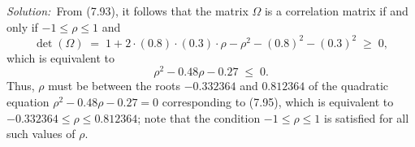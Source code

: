 %

\par\medskip\noindent\textit{Solution:}\ From (7.93), it follows that the matrix $\Omega$ is a
correlation matrix if and only if $-1 \le \rho \le 1$ and
\[
\det(\Omega) \;=\; 1 + 2\cdot(0.8)\cdot(0.3)\cdot\rho - \rho^2 - (0.8)^2 - (0.3)^2 \;\ge\; 0,
\]
which is equivalent to
\begin{equation}
\rho^2 - 0.48\rho - 0.27 \;\le\; 0.
\end{equation}
Thus, $\rho$ must be between the roots $-0.332364$ and $0.812364$ of the quadratic equation
$\rho^2 - 0.48\rho - 0.27 = 0$ corresponding to (7.95), which is equivalent to $-0.332364 \le
\rho \le 0.812364$; note that the condition $-1 \le \rho \le 1$ is satisfied for all such values
of $\rho$.


